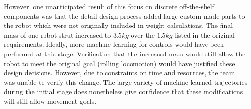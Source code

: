 \documentclass[12pt]{report}
\begin{document}
\begin{table}[ht]
\caption{Off-the-Shelf Engineering Components in Preliminary Pre-v1.0 Design}%
\label{tab:major_components}%
\begin{center}%
\end{center}
\end{table}

However, one unanticipated result of this focus on discrete off-the-shelf components was that the detail design process added large custom-made parts to the robot which were not originally included in weight calculations.
The final mass of one robot strut increased to $3.5 kg$ over the $1.5 kg$ listed in the original requirements.
Ideally, more machine learning for controls would have been performed at this stage.
Verification that the increased mass would still allow the robot to meet the original goal (rolling locomotion) would have justified these design decisions.
However, due to constraints on time and resources, the team was unable to verify this change.
The large variety of machine-learned trajectories during the initial stage does nonetheless give confidence that these modifications will still allow movement goals.


\end{document}
